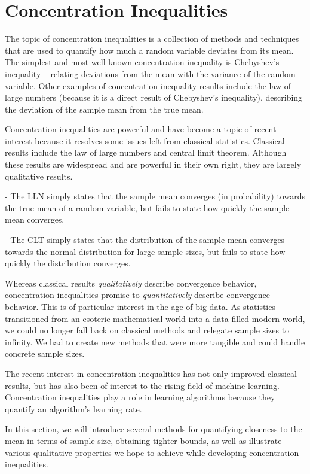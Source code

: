 \pagebreak
\section{Concentration Inequalities}

The topic of concentration inequalities is a collection of methods and techniques that are used to quantify how much a random variable deviates from its mean. The simplest and most well-known concentration inequality is Chebyshev's inequality -- relating deviations from the mean with the variance of the random variable. Other examples of concentration inequality results include the law of large numbers (because it is a direct result of Chebyshev's inequality), describing the deviation of the sample mean from the true mean. 

Concentration inequalities are powerful and have become a topic of recent interest because it resolves some issues left from classical statistics. Classical results include the law of large numbers and central limit theorem. Although these results are widespread and are powerful in their own right, they are largely qualitative results. 

\indent  - The LLN simply states that the sample mean converges (in probability) towards the true mean of a random variable, but fails to state how quickly the sample mean converges. 

\indent - The CLT simply states that the distribution of the sample mean converges towards the normal distribution for large sample sizes, but fails to state how quickly the distribution converges.  

Whereas classical results \textit{qualitatively} describe convergence behavior, concentration inequalities promise to \textit{quantitatively} describe convergence behavior. This is of particular interest in the age of big data. As statistics transitioned from an esoteric mathematical world into a data-filled modern world, we could no longer fall back on classical methods and relegate sample sizes to infinity. We had to create new methods that were more tangible and could handle concrete sample sizes. 

The recent interest in concentration inequalities has not only improved classical results, but has also been of interest to the rising field of machine learning. Concentration inequalities play a role in learning algorithms because they quantify an algorithm's learning rate. 

In this section, we will introduce several methods for quantifying closeness to the mean in terms of sample size, obtaining tighter bounds, as well as illustrate various qualitative properties we hope to achieve while developing concentration inequalities.  


